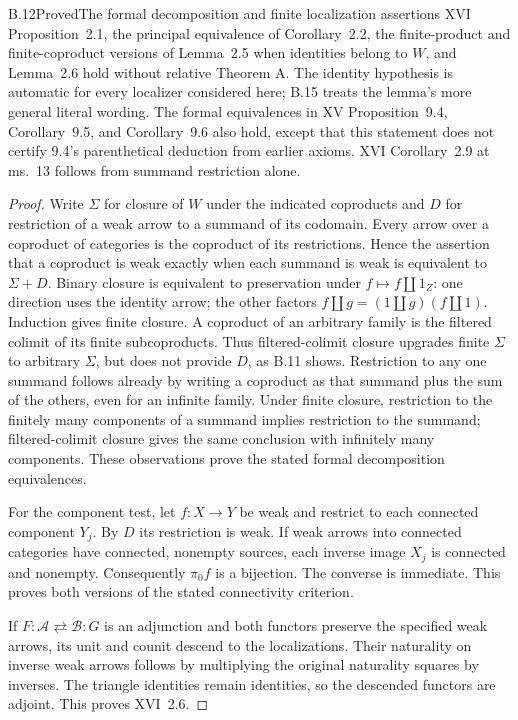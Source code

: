 \begin{claim}{B.12}{Proved}{The formal decomposition and finite localization assertions}
XVI Proposition~2.1, the principal equivalence of Corollary~2.2,
the finite-product and finite-coproduct versions of Lemma~2.5 when
identities belong to $W$, and Lemma~2.6 hold without relative Theorem A.
The identity hypothesis is automatic for every localizer considered
here; B.15 treats the lemma's more general literal wording.
The formal equivalences in XV Proposition~9.4,
Corollary~9.5, and Corollary~9.6 also hold, except that this statement
does not certify 9.4's parenthetical deduction from earlier axioms.
XVI Corollary~2.9 at ms.~13 follows from summand restriction alone.
\end{claim}
\begin{proof}
Write $\Sigma$ for closure of $W$ under the indicated coproducts and
$D$ for restriction of a weak arrow to a summand of its codomain.
Every arrow over a coproduct of categories is the coproduct of its
restrictions. Hence the assertion that a coproduct is weak exactly
when each summand is weak is equivalent to $\Sigma+D$. Binary closure
is equivalent to preservation under $f\mapsto f\amalg1_Z$: one
direction uses the identity arrow; the other factors
$f\amalg g=(1\amalg g)(f\amalg1)$. Induction gives finite closure.
A coproduct of an arbitrary family is the filtered colimit of its
finite subcoproducts. Thus filtered-colimit closure upgrades finite
$\Sigma$ to arbitrary $\Sigma$, but does not provide $D$, as B.11 shows.
Restriction to any one summand follows already by writing a coproduct
as that summand plus the sum of the others, even for an infinite family.
Under finite closure, restriction to the finitely many components of
a summand implies restriction to the summand; filtered-colimit closure
gives the same conclusion with infinitely many components.
These observations prove the stated formal decomposition equivalences.

For the component test, let $f:X\to Y$ be weak and restrict to each
connected component $Y_j$. By $D$ its restriction is weak. If weak
arrows into connected categories have connected, nonempty sources,
each inverse image $X_j$ is connected and nonempty. Consequently
$\pi_0f$ is a bijection. The converse is immediate. This proves both
versions of the stated connectivity criterion.

If $F:\mathcal A\rightleftarrows\mathcal B:G$ is an adjunction and
both functors preserve the specified weak arrows, its unit and counit
descend to the localizations. Their naturality on inverse weak arrows
follows by multiplying the original naturality squares by inverses.
The triangle identities remain identities, so the descended functors
are adjoint. This proves XVI~2.6.


\end{proof}
